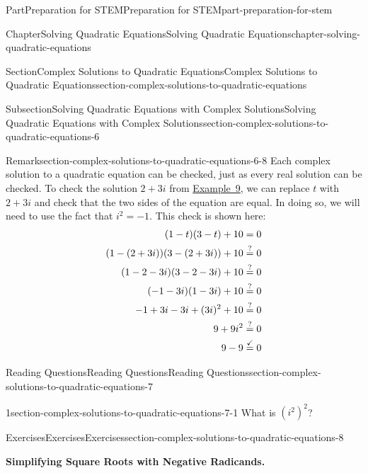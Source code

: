 \documentclass[twoside,10pt,]{book}
\newlength{\fillinmaxwidth}
\newlength{\fillincontract}
\newlength{\charmaxwidth}\setlength{\charmaxwidth}{0.5em}
\newlength{\charminwidth}\setlength{\charminwidth}{0.1em}
\newlength{\fillinheight}
\newcommand{\fillintext}[1]{%
\setlength{\fillinmaxwidth}{#1\charmaxwidth}%
\setlength{\fillincontract}{#1\charminwidth}%
\setlength{\fillinheight}{\baselineskip}\addtolength{\fillinheight}{1.2pt}%
{\color{fillintextshade}\strut\nobreak\leaders\vbox{\hrule width 0.3pt height \fillinheight \vskip -1.2pt}\hskip 1\fillinmaxwidth minus \fillincontract}%
}
\numberwithin{equation}{section}
\newcommand{\substitute}[1]{{\color{blue}{{#1}}}}
\newcommand{\confirm}[1]{\stackrel{\checkmark}{#1}}
\newcommand{\wonder}[1]{\stackrel{\text{?}}{#1}}
\newcommand{\amp}{&}
\begin{document}
\begin{partptx}{Part}{Preparation for STEM}{}{Preparation for STEM}{}{}{part-preparation-for-stem}
\begin{chapterptx}{Chapter}{Solving Quadratic Equations}{}{Solving Quadratic Equations}{}{}{chapter-solving-quadratic-equations}
\begin{sectionptx}{Section}{Complex Solutions to Quadratic Equations}{}{Complex Solutions to Quadratic Equations}{}{}{section-complex-solutions-to-quadratic-equations}
\begin{subsectionptx}{Subsection}{Solving Quadratic Equations with Complex Solutions}{}{Solving Quadratic Equations with Complex Solutions}{}{}{section-complex-solutions-to-quadratic-equations-6}
\begin{remark}{Remark}{}{section-complex-solutions-to-quadratic-equations-6-8}%
Each complex solution to a quadratic equation can be checked, just as every real solution can be checked. To check the solution \(2+3i\) from \hyperref[example-solve-quadratic-complex-solution]{Example~9}, we can replace \(t\) with \(2+3i\) and check that the two sides of the equation are equal. In doing so, we will need to use the fact that \(i^2=-1\). This check is shown here:%
\begin{align*}
(1-t)(3-t)+10\amp=0\\
(1-\substitute{(2+3i)})(3-\substitute{(2+3i)})+10\amp\wonder{=}0\\
(1-2-3i)(3-2-3i)+10\amp\wonder{=}0\\
(-1-3i)(1-3i)+10\amp\wonder{=}0\\
-1+3i-3i+(3i)^2+10\amp\wonder{=}0\\
9+9i^2\amp\wonder{=}0\\
9-9\amp\confirm{=}0
\end{align*}
%
\end{remark}
\end{subsectionptx}
%
%
\typeout{************************************************}
\typeout{************************************************}
%
\begin{reading-questions-subsection}{Reading Questions}{Reading Questions}{}{Reading Questions}{}{}{section-complex-solutions-to-quadratic-equations-7}
\begin{divisionexercise}{1}{}{}{section-complex-solutions-to-quadratic-equations-7-1}%
What is \(\left(i^2\right)^2\)?%
\end{divisionexercise}%
%
\end{reading-questions-subsection}
%
%
\typeout{************************************************}
\typeout{************************************************}
%
\begin{exercises-subsection}{Exercises}{Exercises}{}{Exercises}{}{}{section-complex-solutions-to-quadratic-equations-8}
\par\medskip\noindent%
\textbf{Simplifying Square Roots with Negative Radicands.}\space\space%

\end{exercises-subsection}
\end{sectionptx}
\end{chapterptx}
\end{partptx}
\end{document}
